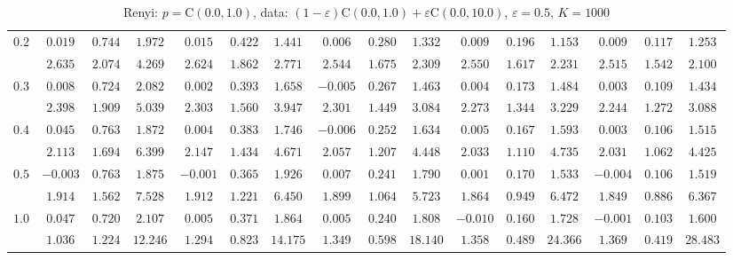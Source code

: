 \begin{table}[ht]
\begin{center}
\begin{tabular}{|c|ccc|ccc|ccc|ccc|ccc|}
\hline 
$0.2$ & $ 0.019 $ & $ 0.744 $ & $ 1.972 $ & $ 0.015 $ & $ 0.422 $ & $ 1.441 $ & $ 0.006 $ & $ 0.280 $ & $ 1.332 $ & $ 0.009 $ & $ 0.196 $ & $ 1.153 $ & $ 0.009 $ & $ 0.117 $ & $ 1.253 $\\ 
 & $ 2.635 $ & $ 2.074 $ & $ 4.269 $ & $ 2.624 $ & $ 1.862 $ & $ 2.771 $ & $ 2.544 $ & $ 1.675 $ & $ 2.309 $ & $ 2.550 $ & $ 1.617 $ & $ 2.231 $ & $ 2.515 $ & $ 1.542 $ & $ 2.100 $\\ 
\hline 
$0.3$ & $ 0.008 $ & $ 0.724 $ & $ 2.082 $ & $ 0.002 $ & $ 0.393 $ & $ 1.658 $ & $ -0.005 $ & $ 0.267 $ & $ 1.463 $ & $ 0.004 $ & $ 0.173 $ & $ 1.484 $ & $ 0.003 $ & $ 0.109 $ & $ 1.434 $\\ 
 & $ 2.398 $ & $ 1.909 $ & $ 5.039 $ & $ 2.303 $ & $ 1.560 $ & $ 3.947 $ & $ 2.301 $ & $ 1.449 $ & $ 3.084 $ & $ 2.273 $ & $ 1.344 $ & $ 3.229 $ & $ 2.244 $ & $ 1.272 $ & $ 3.088 $\\ 
\hline 
$0.4$ & $ 0.045 $ & $ 0.763 $ & $ 1.872 $ & $ 0.004 $ & $ 0.383 $ & $ 1.746 $ & $ -0.006 $ & $ 0.252 $ & $ 1.634 $ & $ 0.005 $ & $ 0.167 $ & $ 1.593 $ & $ 0.003 $ & $ 0.106 $ & $ 1.515 $\\ 
 & $ 2.113 $ & $ 1.694 $ & $ 6.399 $ & $ 2.147 $ & $ 1.434 $ & $ 4.671 $ & $ 2.057 $ & $ 1.207 $ & $ 4.448 $ & $ 2.033 $ & $ 1.110 $ & $ 4.735 $ & $ 2.031 $ & $ 1.062 $ & $ 4.425 $\\ 
\hline 
$0.5$ & $ -0.003 $ & $ 0.763 $ & $ 1.875 $ & $ -0.001 $ & $ 0.365 $ & $ 1.926 $ & $ 0.007 $ & $ 0.241 $ & $ 1.790 $ & $ 0.001 $ & $ 0.170 $ & $ 1.533 $ & $ -0.004 $ & $ 0.106 $ & $ 1.519 $\\ 
 & $ 1.914 $ & $ 1.562 $ & $ 7.528 $ & $ 1.912 $ & $ 1.221 $ & $ 6.450 $ & $ 1.899 $ & $ 1.064 $ & $ 5.723 $ & $ 1.864 $ & $ 0.949 $ & $ 6.472 $ & $ 1.849 $ & $ 0.886 $ & $ 6.367 $\\ 
\hline 
$1.0$ & $ 0.047 $ & $ 0.720 $ & $ 2.107 $ & $ 0.005 $ & $ 0.371 $ & $ 1.864 $ & $ 0.005 $ & $ 0.240 $ & $ 1.808 $ & $ -0.010 $ & $ 0.160 $ & $ 1.728 $ & $ -0.001 $ & $ 0.103 $ & $ 1.600 $\\ 
 & $ 1.036 $ & $ 1.224 $ & $ 12.246 $ & $ 1.294 $ & $ 0.823 $ & $ 14.175 $ & $ 1.349 $ & $ 0.598 $ & $ 18.140 $ & $ 1.358 $ & $ 0.489 $ & $ 24.366 $ & $ 1.369 $ & $ 0.419 $ & $ 28.483 $\\ 
\hline 
\end{tabular}
\caption{Renyi: $p = \mathrm{C}(0.0,1.0)$, data: $(1-\varepsilon)\mathrm{C}(0.0,1.0) + \varepsilon \mathrm{C}(0.0,10.0)$, $\varepsilon =  0.5$, $K = 1000$} 
\end{center}
\end{table}

%
